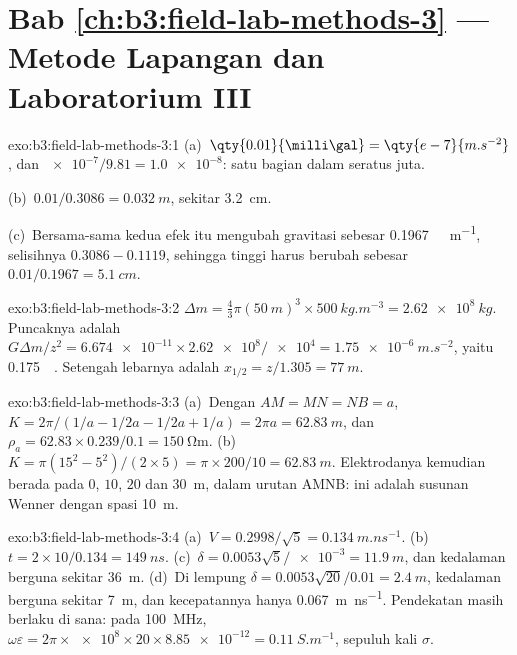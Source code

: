 \section*{Bab \ref{ch:b3:field-lab-methods-3} --- Metode Lapangan dan Laboratorium III}

\begin{solution}{exo:b3:field-lab-methods-3:1}
(a)~$\qty{0.01}{\milli\gal} = \qty{e-7}{m.s^{-2}}$, dan
$\num{e-7}/\num{9.81} = \num{1.0e-8}$: satu bagian dalam seratus juta.

(b)~$0.01/0.3086 = \qty{0.032}{m}$, sekitar \qty{3.2}{cm}.

(c)~Bersama-sama kedua efek itu mengubah gravitasi sebesar
\qty{0.1967}{\milli\gal.m^{-1}}, selisihnya $0.3086 - 0.1119$, sehingga
tinggi harus berubah sebesar $0.01/0.1967 = \qty{5.1}{cm}$.
\end{solution}

\begin{solution}{exo:b3:field-lab-methods-3:2}
$\Delta m = \tfrac43\pi(\qty{50}{m})^3\times\qty{500}{kg.m^{-3}} =
\qty{2.62e8}{kg}$. Puncaknya adalah $G\Delta m/z^2 =
\num{6.674e-11}\times\num{2.62e8}/\num{e4} = \qty{1.75e-6}{m.s^{-2}}$,
yaitu \qty{0.175}{\milli\gal}. Setengah lebarnya adalah $x_{1/2} = z/1.305 =
\qty{77}{m}$.
\end{solution}

\begin{solution}{exo:b3:field-lab-methods-3:3}
(a)~Dengan $AM = MN = NB = a$, $K = 2\pi/(1/a - 1/2a - 1/2a + 1/a) =
2\pi a = \qty{62.83}{m}$, dan $\rho_a = 62.83\times0.239/0.1 =
\qty{150}{\ohm\metre}$. (b)~$K = \pi(15^2 - 5^2)/(2\times5) = \pi\times
200/10 = \qty{62.83}{m}$. Elektrodanya kemudian berada pada $0$, $10$, $20$
dan \qty{30}{m}, dalam urutan AMNB: ini adalah susunan Wenner dengan spasi
\qty{10}{m}.
\end{solution}

\begin{solution}{exo:b3:field-lab-methods-3:4}
(a)~$V = 0.2998/\sqrt5 = \qty{0.134}{m.ns^{-1}}$. (b)~$t =
2\times10/0.134 = \qty{149}{ns}$. (c)~$\delta = 0.0053\sqrt5/\num{e-3} =
\qty{11.9}{m}$, dan kedalaman berguna sekitar \qty{36}{m}. (d)~Di lempung
$\delta = 0.0053\sqrt{20}/0.01 = \qty{2.4}{m}$, kedalaman berguna sekitar
\qty{7}{m}, dan kecepatannya hanya \qty{0.067}{m.ns^{-1}}. Pendekatan
masih berlaku di sana: pada \qty{100}{MHz},
$\omega\varepsilon = 2\pi\times\num{e8}\times20\times\num{8.85e-12} =
\qty{0.11}{S.m^{-1}}$, sepuluh kali $\sigma$.
\end{solution}

